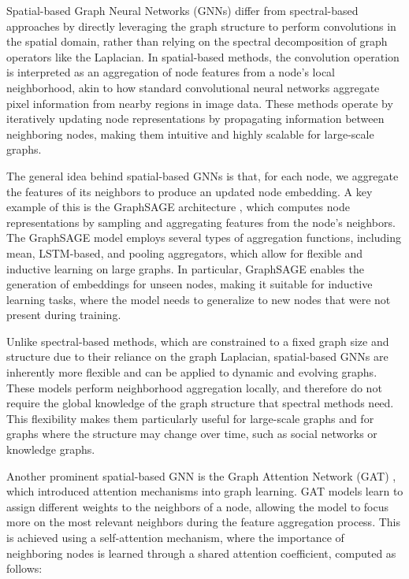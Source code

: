 Spatial-based Graph Neural Networks (GNNs) differ from spectral-based approaches by directly leveraging the graph structure to perform convolutions in the spatial domain, rather than relying on the spectral decomposition of graph operators like the Laplacian. In spatial-based methods, the convolution operation is interpreted as an aggregation of node features from a node’s local neighborhood, akin to how standard convolutional neural networks aggregate pixel information from nearby regions in image data. These methods operate by iteratively updating node representations by propagating information between neighboring nodes, making them intuitive and highly scalable for large-scale graphs.

The general idea behind spatial-based GNNs is that, for each node, we aggregate the features of its neighbors to produce an updated node embedding. A key example of this is the GraphSAGE architecture \cite{hamilton2017inductive}, which computes node representations by sampling and aggregating features from the node’s neighbors. The GraphSAGE model employs several types of aggregation functions, including mean, LSTM-based, and pooling aggregators, which allow for flexible and inductive learning on large graphs. In particular, GraphSAGE enables the generation of embeddings for unseen nodes, making it suitable for inductive learning tasks, where the model needs to generalize to new nodes that were not present during training. 

Unlike spectral-based methods, which are constrained to a fixed graph size and structure due to their reliance on the graph Laplacian, spatial-based GNNs are inherently more flexible and can be applied to dynamic and evolving graphs. These models perform neighborhood aggregation locally, and therefore do not require the global knowledge of the graph structure that spectral methods need. This flexibility makes them particularly useful for large-scale graphs and for graphs where the structure may change over time, such as social networks or knowledge graphs.

Another prominent spatial-based GNN is the Graph Attention Network (GAT) \cite{velivckovic2017graph}, which introduced attention mechanisms into graph learning. GAT models learn to assign different weights to the neighbors of a node, allowing the model to focus more on the most relevant neighbors during the feature aggregation process. This is achieved using a self-attention mechanism, where the importance of neighboring nodes is learned through a shared attention coefficient, computed as follows:

